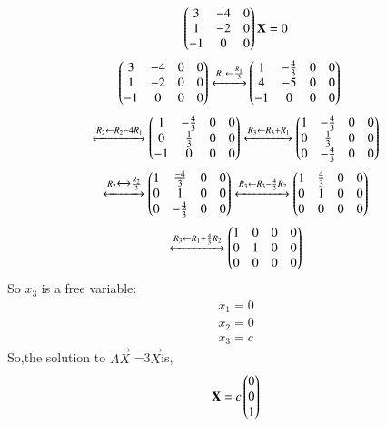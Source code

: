 \documentclass[journal,12pt,twocolumn]{IEEEtran}
\begin{document}
\begin{flushleft}
\begin{align}
\end{align}
\begin{align}
\begin{pmatrix}3&-4&0\\
1&-2&0\\
-1&0&0
\end{pmatrix}\mathbf X=0
\end{align} 
\begin{align}
\begin{pmatrix}3& -4&0&0\\
1 & -2 & 0&0\\
-1 & 0 &0&0
\end{pmatrix}
\xleftrightarrow[]{R_1 \leftarrow \frac{R_1}{3} } 
&
\begin{pmatrix}1&-\frac{4}{3}&0&0\\
4&-5&0&0\\
-1&0&0&0\end{pmatrix}\nonumber 
\end{align}
\begin{align}
\xleftrightarrow[]{R_2 \leftarrow R_2-4R_1} 
    \begin{pmatrix}1&-\frac{4}{3}&0&0\\
            0&\frac{1}{3}&0&0\\
            -1&0&0&0\end{pmatrix}
    \xleftrightarrow[]{R_3 \leftarrow R_3+R_1 }
    \begin{pmatrix}1&-\frac{4}{3}&0&0\\
            0&\frac{1}{3}&0&0\\
            0&-\frac{4}{3}&0&0\end{pmatrix}
     \nonumber
\end{align}
\begin{align}
\xleftrightarrow[]{R_2 \xleftrightarrow[]{} \frac{R_2}{3} }
    \begin{pmatrix}1&\frac{-4}{3}&0&0\\
    0&1&0&0\\
    0&-\frac{4}{3}&0&0\end{pmatrix}
    \xleftrightarrow[]{R_3 \leftarrow R_3-\frac{4}{3}R_2} 
    \begin{pmatrix}1&\frac{4}{3}&0&0\\
           0&1&0&0\\
         0&0&0&0\end{pmatrix}   
    \nonumber
\end{align}
\begin{align} \label{eq:eq_15}
 \xleftrightarrow[]{R_3 \leftarrow R_1+\frac{4}{3}R_2}
    \begin{pmatrix}1&0&0&0\\
    0&1&0&0\\
    0&0&0&0\end{pmatrix} 
\end{align}
So $x_3$ is a free variable:
\begin{align}
  x_1=0\\
  x_2=0\\
  x_3=c
\end{align}
 So,the solution to $\vec {AX}$ =3$\vec{X}$is,
 \begin{align}\label{eq:222}
 \mathbf{X} =
 c
 \begin{pmatrix}
 0\\0\\1
 \end{pmatrix}
 \end{align}
\end{flushleft}
\end{document}
